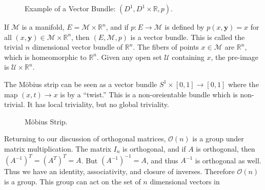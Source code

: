 \documentclass[crop=false,class=book,oneside]{standalone}                      %
\begin{document}
            \begin{figure}[H]
                \centering
                \captionsetup{type=figure}
                
                \caption{Example of a Vector Bundle:
                         $(D^{1},D^{1}\times\mathbb{R},p)$.}
                \label{fig:Simple_Vector_Bundle_Cylinder_to_Disk}
            \end{figure}
            \begin{example}
                If $\mathcal{M}$ is a manifold,
                $E=\mathcal{M}\times\mathbb{R}^{n}$, and if
                $p:E\rightarrow\mathcal{M}$ is defined by $p(x,\mathbf{y})=x$
                for all $(x,\mathbf{y})\in\mathcal{M}\times\mathbb{R}^{n}$,
                then $(E,\mathcal{M},p)$ is a vector bundle. This is called
                the trivial $n$ dimensional vector bundle of $\mathbb{R}^{n}$.
                The fibers of points $x\in\mathcal{M}$ are $\mathbb{R}^{n}$,
                which is homeomorphic to $\mathbb{R}^{n}$. Given any open set
                $\mathcal{U}$ containing $x$, the pre-image is
                $\mathcal{U}\times\mathbb{R}^{n}$.
            \end{example}
            \begin{example}
                The M\"{o}bius strip can be seen as a vector bundle
                $S^{1}\times[0,1]\rightarrow[0,1]$ where the map
                $(x,t)\rightarrow{x}$ is by a ``twist.'' This is a
                non-oreientable bundle which is non-trivial. It has local
                triviality, but no global triviality.
            \end{example}
            \begin{figure}[H]
                \centering
                \captionsetup{type=figure}
                
                \caption{M\"{o}bius Strip.}
                \label{fig:Surgery_Theory_Mobius_Strip_Vector_Bundle}
            \end{figure}
            Returning to our discussion of orthogonal matrices,
            $\mathcal{O}(n)$ is a group under matrix multiplication.
            The matrix $I_{n}$ is orthogonal, and if $A$ is orthogonal,
            then $(A^{-1})^{T}=(A^{T})^{T}=A$. But $(A^{-1})^{-1}=A$,
            and thus $A^{-1}$ is orthogonal as well. Thus we have
            an identity, associativity, and closure of inverses.
            Therefore $\mathcal{O}(n)$ is a group. This group can
            act on the set of $n$ dimensional vectors in
\end{document}

